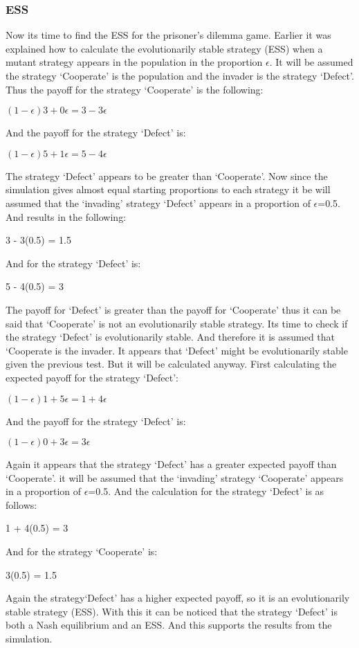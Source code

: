 \subsubsection{ESS}
Now its time to find the ESS for the prisoner's dilemma game. Earlier it was explained how to calculate the evolutionarily stable strategy (ESS) when a mutant strategy appears in the population in the proportion $\epsilon$. It will be assumed the strategy  `Cooperate' is the population and the invader is the strategy `Defect'. Thus the payoff for the strategy `Cooperate' is the following:
\begin{center}
$(1-{\epsilon})3 + 0{\epsilon} = 3 - 3{\epsilon}$
\end{center}
And the payoff for the strategy `Defect' is:
\begin{center}
$(1-{\epsilon})5 + 1{\epsilon} = 5 - 4{\epsilon}$
\end{center}
The strategy `Defect' appears to be greater than `Cooperate'. Now since the simulation gives almost equal starting proportions to each strategy it be will assumed that the `invading' strategy `Defect' appears in a proportion of $\epsilon$=0.5. And results in  the following:
\begin{center}
3 - 3(0.5) = 1.5
\end{center}
And for the strategy `Defect' is:
\begin{center}
 5 - 4(0.5) = 3
\end{center}
The payoff for `Defect' is greater than the payoff for `Cooperate' thus it can be said that `Cooperate' is not an evolutionarily stable strategy.
Its time to check if the strategy `Defect' is evolutionarily stable. And therefore it is assumed that `Cooperate is the invader. It  appears that `Defect' might be evolutionarily stable given the previous test. But it will be calculated anyway. First calculating the expected payoff for the strategy `Defect':
\begin{center}
$(1-{\epsilon})1 + 5{\epsilon} = 1 + 4{\epsilon}$
\end{center}
And the payoff for the strategy `Defect' is:
\begin{center}
$(1-{\epsilon})0 + 3{\epsilon} =  3{\epsilon}$
\end{center}
Again it appears that the strategy `Defect' has a greater expected payoff than `Cooperate'. it will be assumed that the `invading' strategy `Cooperate' appears in a proportion of $\epsilon$=0.5. And the calculation for the strategy `Defect' is as follows:
\begin{center}
1 +  4(0.5) = 3
\end{center}
And for the strategy `Cooperate' is:
\begin{center}
 3(0.5) = 1.5
\end{center}
Again the strategy`Defect' has a higher expected payoff, so it is an evolutionarily stable strategy (ESS).
With this it can be noticed that the strategy `Defect' is both a Nash equilibrium and an ESS. And this supports the results from the simulation.


